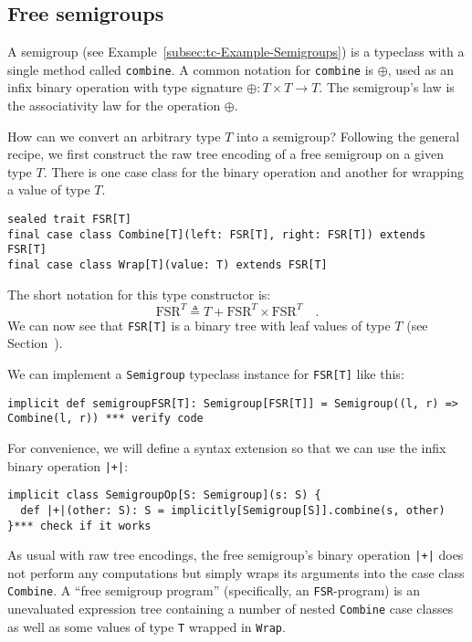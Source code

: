 \subsection{Free semigroups}

A semigroup (see Example~\ref{subsec:tc-Example-Semigroups}) is
a typeclass with a single method called \lstinline!combine!.
A common notation for \lstinline!combine!
is $\oplus$, used as an infix binary operation with type signature
$\oplus:T\times T\rightarrow T$. The semigroup\textsf{'}s law is the associativity
law for the operation $\oplus$.

How can we convert an arbitrary type $T$ into a semigroup? Following
the general recipe, we first construct the raw tree encoding of a
free semigroup on a given type $T$. There is one case class for the
binary operation and another for wrapping a value of type $T$.
\begin{lstlisting}
sealed trait FSR[T]
final case class Combine[T](left: FSR[T], right: FSR[T]) extends FSR[T]
final case class Wrap[T](value: T) extends FSR[T]
\end{lstlisting}
The short notation for this type constructor is:
\[
\text{FSR}^{T}\triangleq T+\text{FSR}^{T}\times\text{FSR}^{T}\quad.
\]
We can now see that \lstinline!FSR[T]!
is a binary tree with leaf values of type $T$ (see Section~).

We can implement a \lstinline!Semigroup!
typeclass instance for \lstinline!FSR[T]!
like this:
\begin{lstlisting}
implicit def semigroupFSR[T]: Semigroup[FSR[T]] = Semigroup((l, r) => Combine(l, r)) *** verify code
\end{lstlisting}
For convenience, we will define a syntax extension so that we can
use the infix binary operation \lstinline!|+|!:
\begin{lstlisting}
implicit class SemigroupOp[S: Semigroup](s: S) {
  def |+|(other: S): S = implicitly[Semigroup[S]].combine(s, other)
}*** check if it works
\end{lstlisting}
As usual with raw tree encodings, the free semigroup\textsf{'}s binary operation
\lstinline!|+|! does not
perform any computations but simply wraps its arguments into the case
class \lstinline!Combine!.
A \textsf{``}free semigroup program\textsf{''} (specifically, an \lstinline!FSR!-program)
is an unevaluated expression tree containing a number of nested \lstinline!Combine!
case classes as well as some values of type \lstinline!T!
wrapped in \lstinline!Wrap!. 

